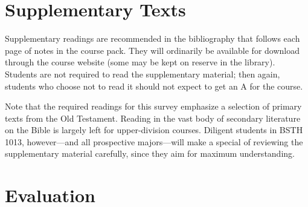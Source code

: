 \documentclass[titlepage]{article}
\newcommand\coursecode   {BSTH 1013}
\begin{document}
\section{Supplementary Texts}
\label{supplementary}

Supplementary readings are recommended in the bibliography that follows
each page of notes in the course pack. They will ordinarily be available
for download through the course website (some may be kept on reserve
in the library). Students are not required to read the supplementary
material; then again, students who choose not to read it should not
expect to get an A for the course.

Note that the required readings for this survey emphasize a selection
of primary texts from the Old Testament. Reading in the vast body of
secondary literature on the Bible is largely left for upper-division
courses. Diligent students in \coursecode, however---and all prospective
majors---will make a special of reviewing the supplementary material
carefully, since they aim for maximum understanding.

\section{Evaluation}
\label{evaluation}

\end{document}
